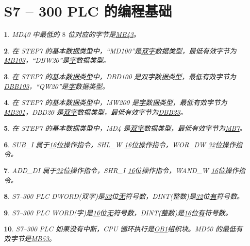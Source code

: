 \documentclass{ctexart}
\theoremstyle{change}
\newtheorem{ti}{}[section]
\begin{document}
\section{S7 -- 300 PLC 的编程基础}

\begin{ti}
	MD40 中最低的 $8$ 位对应的字节是\uline{MB43}。
\end{ti}

\begin{ti}
	在 STEP7 的基本数据类型中，“MD100”是\uline{双字}数据类型，最低有效字节为\uline{MB103}，“DBW20”是\uline{字}数据类型。
\end{ti}

\begin{ti}
	在 STEP7 的基本数据类型中，DBD100 是\uline{双字}数据类型，最低有效字节为\uline{DBB103}，“QW20”是\uline{字}数据类型。
\end{ti}

\begin{ti}
	在 STEP7 的基本数据类型中，MW200 是\uline{字}数据类型，最低有效字节为\uline{MB201}，DBD20 是\uline{双字}数据类型，最低有效字节为\uline{DBB23}。
\end{ti}

\begin{ti}
	在 STEP7 的基本数据类型中，MD4 是\uline{双字}数据类型，最低有效字节为\uline{MB7}。
\end{ti}

\begin{ti}
	SUB\_I 属于\uline{16}位操作指令，SHL\_W \uline{16}位操作指令，WOR\_DW \uline{32}位操作指令。
\end{ti}

\begin{ti}
	ADD\_DI 属于\uline{32}位操作指令，SHR\_I \uline{16}位操作指令，WAND\_W \uline{16}位操作指令。
\end{ti}

\begin{ti}
	S7--300 PLC DWORD(双字)是\uline{32}位\uline{无}符号数，DINT(整数)是\uline{32}位\uline{有}符号数。
\end{ti}

\begin{ti}
	S7--300 PLC WORD(字)是\uline{16}位\uline{无}符号数，DINT(整数)是\uline{16}位\uline{有}符号数。
\end{ti}

\begin{ti}
	S7--300 PLC 如果没有中断，CPU 循环执行是\uline{OB1}组织块。MD50 的最低有效字节是\uline{MB53}。
\end{ti}
\end{document}
